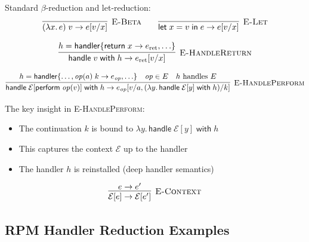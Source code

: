 \begin{definition}
\label{def:core-reduction}
Standard $\beta$-reduction and let-reduction:
\[
\infer[\textsc{E-Beta}]
  {(\lambda x.\, e)\; v \to e[v/x]}
  {}
\qquad
\infer[\textsc{E-Let}]
  {\mathsf{let}\; x = v\; \mathsf{in}\; e \to e[v/x]}
  {}
\]
\end{definition}

\begin{definition}
\label{def:handler-reduction}
\[
\infer[\textsc{E-HandleReturn}]
  {\mathsf{handle}\; v\; \mathsf{with}\; h \to e_{\mathrm{ret}}[v/x]}
  {h = \mathsf{handler}\{\mathsf{return}\; x \to e_{\mathrm{ret}}, \ldots\}}
\]

\[
\infer[\textsc{E-HandlePerform}]
  {\mathsf{handle}\; \mathcal{E}[\mathsf{perform}\; \mathit{op}(v)]\; \mathsf{with}\; h \to e_{\mathit{op}}[v/a, (\lambda y.\, \mathsf{handle}\; \mathcal{E}[y]\; \mathsf{with}\; h)/k]}
  {
    h = \mathsf{handler}\{\ldots, \mathit{op}(a)\; k \to e_{\mathit{op}}, \ldots\} &
    \mathit{op} \in E &
    h \text{ handles } E
  }
\]

The key insight in \textsc{E-HandlePerform}:
\begin{itemize}
  \item The continuation $k$ is bound to $\lambda y.\, \mathsf{handle}\; \mathcal{E}[y]\; \mathsf{with}\; h$
  \item This captures the context $\mathcal{E}$ up to the handler
  \item The handler $h$ is reinstalled (deep handler semantics)
\end{itemize}
\end{definition}

\begin{definition}
\label{def:context-reduction}
\[
\infer[\textsc{E-Context}]
  {\mathcal{E}[e] \to \mathcal{E}[e']}
  {e \to e'}
\]
\end{definition}

\subsection{RPM Handler Reduction Examples}
\label{subsec:rpm-reduction-ex}

